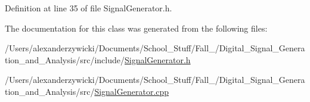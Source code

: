 Definition at line 35 of file Signal\+Generator.\+h.



The documentation for this class was generated from the following files\+:\begin{DoxyCompactItemize}
\item 
/\+Users/alexanderzywicki/\+Documents/\+School\+\_\+\+Stuff/\+Fall\+\_/\+Digital\+\_\+\+Signal\+\_\+\+Generation\+\_\+and\+\_\+\+Analysis/src/include/\hyperlink{SignalGenerator_8h}{Signal\+Generator.\+h}\item 
/\+Users/alexanderzywicki/\+Documents/\+School\+\_\+\+Stuff/\+Fall\+\_/\+Digital\+\_\+\+Signal\+\_\+\+Generation\+\_\+and\+\_\+\+Analysis/src/\hyperlink{SignalGenerator_8cpp}{Signal\+Generator.\+cpp}\end{DoxyCompactItemize}
